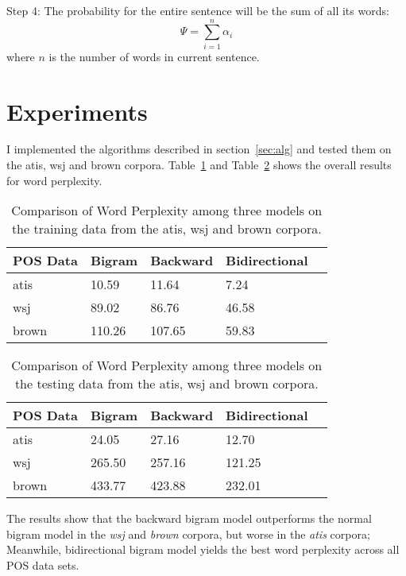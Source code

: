 \documentclass[10pt]{article}
\begin{document}
Step 4: The probability for the entire sentence will be the sum of all its words:
\[
   \Psi = \sum_{i=1}^{n}{ \alpha_{i}}
\]
 where $n$ is the number of words in current sentence.
\section{Experiments}
I implemented the algorithms described in section~\ref{sec:alg} and tested them on the atis, wsj and brown corpora.  Table~\ref{table:train} and Table~\ref{table:test} shows the overall results for word perplexity.

\begin{table}
\begin{center}
\begin{tabular}{|l|l|l|l|l|}  \hline
POS Data    & Bigram & Backward & Bidirectional \\ \hline
atis        & 10.59 & 11.64 & 7.24  \\ \hline
wsj         & 89.02 & 86.76 & 46.58  \\  \hline
brown       & 110.26 & 107.65 & 59.83  \\  \hline
\end{tabular}
\caption{\small Comparison of Word Perplexity among three models on the training data from the atis, wsj and brown corpora.}\label{table:train}
\end{center}
\end{table}

\begin{table}
\begin{center}
\begin{tabular}{|l|l|l|l|l|}  \hline
POS Data    & Bigram & Backward & Bidirectional \\ \hline
atis        & 24.05 & 27.16 & 12.70  \\ \hline
wsj         & 265.50 & 257.16 & 121.25  \\  \hline
brown       & 433.77 & 423.88 & 232.01  \\  \hline
\end{tabular}
\caption{\small Comparison of Word Perplexity among three models on the testing data from the atis, wsj and brown corpora.}\label{table:test}
\end{center}
\end{table}

The results show that the backward bigram model outperforms the normal bigram model in the \emph{wsj} and \emph{brown} corpora, but worse in the \emph{atis} corpora; Meanwhile, bidirectional bigram model yields the best word perplexity across all POS data sets.
\end{document}
